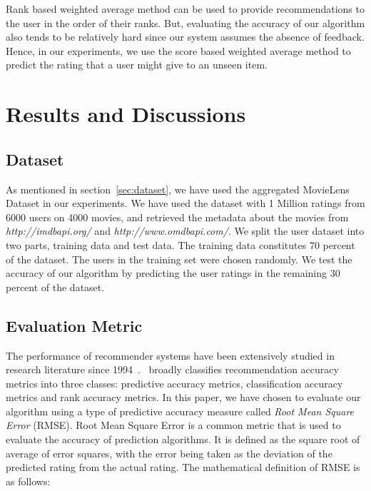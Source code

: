 \documentclass{acm_proc_article-sp}
\begin{document}
Rank based weighted average method can be used to provide recommendations to the user in the order of their ranks. But, evaluating the accuracy of our algorithm also tends to be relatively hard since our system assumes the absence of feedback. Hence, in our experiments, we use the score based weighted average method to predict the rating that a user might give to an unseen item.


\section{Results and Discussions}
\label{sec:results}
\subsection{Dataset}
As mentioned in section~\ref{sec:dataset}, we have used the aggregated MovieLens Dataset in our experiments. We have used the dataset with 1 Million ratings from 6000 users on 4000 movies, and retrieved the metadata about the movies from\\
\emph{http://imdbapi.org/} and \emph{http://www.omdbapi.com/}. We split the user dataset into two parts, training data and test data. The training data constitutes 70 percent of the dataset. The users in the training set were chosen randomly. We test the accuracy of our algorithm by predicting the user ratings in the remaining 30 percent of the dataset.

\subsection{Evaluation Metric}

The performance of recommender systems have been extensively studied in research literature since 1994~\cite{resnick}.~\cite{jonathan} broadly classifies recommendation accuracy metrics into three classes: predictive accuracy metrics, classification accuracy metrics and rank accuracy metrics. In this paper, we have chosen to evaluate our algorithm using a type of predictive accuracy measure called \emph{Root Mean Square Error} (RMSE). Root Mean Square Error is a common metric that is used to evaluate the accuracy of prediction algorithms. It is defined as the square root of average of error squares, with the error being taken as the deviation of the predicted rating from the actual rating. The mathematical definition of RMSE is as follows:
\end{document}
